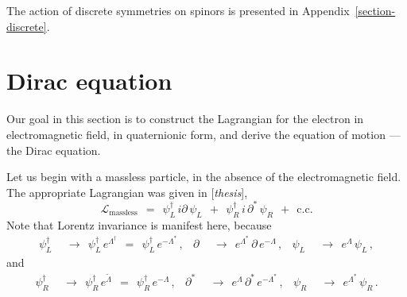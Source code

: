 \documentclass[epsfig,12pt]{article}
\newcommand{\wt}{\widetilde}
\newcommand{\mc}[1]{\mathcal{#1}}
\begin{document}
	The action of discrete symmetries on spinors is presented in Appendix~\ref{section-discrete}.




\section{Dirac equation}
\label{section-dirac}
\setcounter{equation}{0}

	Our goal in this section is to construct the Lagrangian for the electron in electromagnetic field,
	in quaternionic form, and derive the equation of motion --- the Dirac equation.

	Let us begin with a massless particle, in the absence of the electromagnetic field.
	The appropriate Lagrangian was given in [{\it thesis}],
\begin{equation}
\label{L-massless}
	\mc L_\text{massless}
		~~=~~	\psi_L^\dag\, i\partial\, \psi_L  ~~+~~  \psi_R^\dag\, i\,\partial^*\, \psi_R
			~~+~~  \text{c.c.}
\end{equation}
	Note that Lorentz invariance is manifest here, because
\begin{align}
	\psi_L^\dag	& ~~\to~~	\psi_L^\dag\, e^{\Lambda^\dag}  ~~=~~  \psi_L^\dag\, e^{-\Lambda^*}\,,
	&
	\partial	& ~~\to~~	e^{\Lambda^*}\, \partial\, e^{-\Lambda}\,,
	&
	\psi_L		& ~~\to~~	e^\Lambda\, \psi_L\,,
\end{align}
	and
\begin{align}
	\psi_R^\dag	& ~~\to~~	\psi_R^\dag\, e^{\wt \Lambda}  ~~=~~  \psi_R^\dag\, e^{-\Lambda}\,,
	&
	\partial^*	& ~~\to~~	e^\Lambda\, \partial^*\, e^{-\Lambda^*}\,,
	&
	\psi_R		& ~~\to~~	e^{\Lambda^*}\, \psi_R\,.
\end{align}
\end{document}
